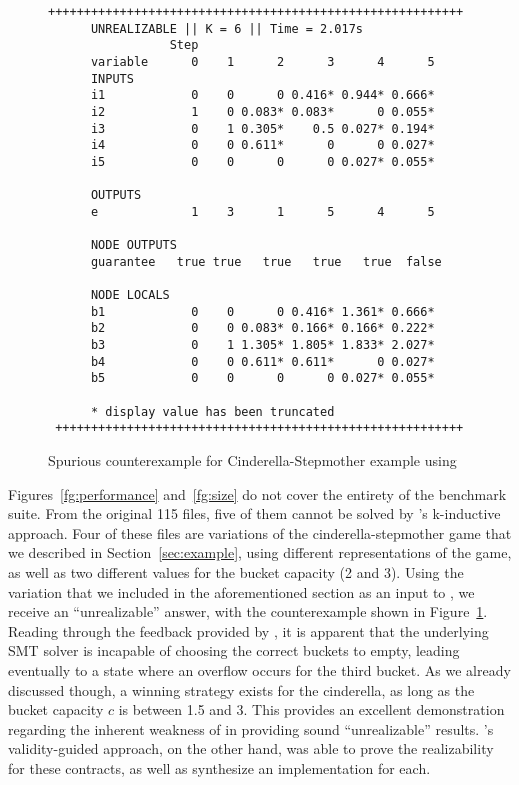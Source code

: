 
\begin{figure}[h]
\centering
 \begin{Verbatim}[fontsize=\scriptsize]
 ++++++++++++++++++++++++++++++++++++++++++++++++++++++++++
      UNREALIZABLE || K = 6 || Time = 2.017s
                 Step
      variable      0    1      2      3      4      5
      INPUTS
      i1            0    0      0 0.416* 0.944* 0.666*
      i2            1    0 0.083* 0.083*      0 0.055*
      i3            0    1 0.305*    0.5 0.027* 0.194*
      i4            0    0 0.611*      0      0 0.027*
      i5            0    0      0      0 0.027* 0.055*

      OUTPUTS
      e             1    3      1      5      4      5

      NODE OUTPUTS
      guarantee   true true   true   true   true  false

      NODE LOCALS
      b1            0    0      0 0.416* 1.361* 0.666*
      b2            0    0 0.083* 0.166* 0.166* 0.222*
      b3            0    1 1.305* 1.805* 1.833* 2.027*
      b4            0    0 0.611* 0.611*      0 0.027*
      b5            0    0      0      0 0.027* 0.055*

      * display value has been truncated
 +++++++++++++++++++++++++++++++++++++++++++++++++++++++++
 \end{Verbatim}
\caption{Spurious counterexample for Cinderella-Stepmother example using \jsyn}

\label{fg:cex}
\end{figure}

Figures~\ref{fg:performance} and~\ref{fg:size} do not cover the entirety of the
benchmark suite. From the original 115 files, five of them cannot be
solved by \jsyn's k-inductive approach. Four of these files are variations of
the cinderella-stepmother game that we described in Section~\ref{sec:example}, using different representations of the game, as well as two different values
for the bucket capacity (2 and 3). Using the variation that we included in the
aforementioned section as an input to \jsyn, we receive an ``unrealizable'' answer, with the counterexample shown
in Figure~\ref{fg:cex}. Reading through the feedback provided by \jsyn, it is
apparent that the underlying SMT solver is incapable of choosing the correct
buckets to empty, leading eventually to a state where an overflow occurs for the
third bucket. As we already discussed though, a winning strategy exists for the
cinderella, as long as the bucket capacity $c$ is between 1.5 and 3. This
provides an excellent demonstration regarding the inherent weakness of \jsyn
in providing sound ``unrealizable'' results. \jsynvg's validity-guided approach,
on the other hand, was able to prove the realizability for these contracts, as
well as synthesize an implementation for each.

